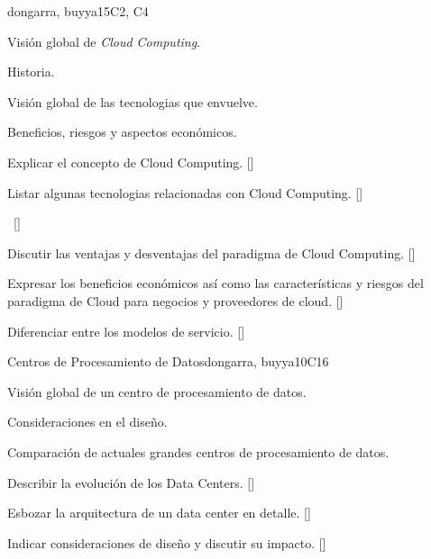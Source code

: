 \begin{syllabus}
\begin{unit}{\PDCloudComputing}{}{dongarra, buyya}{15}{C2, C4}
\begin{topics}
    \item Visión global de {\it Cloud Computing}.
    \item Historia.
    \item Visión global de las tecnologias que envuelve.
    \item Beneficios, riesgos y aspectos económicos.
    \item \PDCloudComputingTopicCloud
    \item \PDCloudComputingTopicInternet
\end{topics}
\begin{learningoutcomes}
    \item Explicar el concepto de Cloud Computing. [\Familiarity]
    \item Listar algunas tecnologias relacionadas con Cloud Computing. [\Familiarity]
    \item \PDCloudComputingLOExplainStrategies~[\Familiarity] %
    \item Discutir las ventajas y desventajas del paradigma de Cloud Computing.  [\Familiarity]
    \item Expresar los beneficios económicos así como las características y riesgos del paradigma de Cloud para negocios y proveedores de cloud.   [\Familiarity]
    \item Diferenciar entre los modelos de servicio.   [\Usage]
\end{learningoutcomes}
\end{unit}

\begin{unit}{Centros de Procesamiento de Datos}{}{dongarra, buyya}{10}{C16}
\begin{topics}
    \item Visión global de un centro de procesamiento de datos.
    \item Consideraciones en el diseño.
    \item Comparación de actuales grandes centros de procesamiento de datos.
\end{topics}
\begin{learningoutcomes}
    \item Describir la evolución de los Data Centers. [\Familiarity]
    \item Esbozar la arquitectura de un data center en detalle. [\Familiarity]
    \item Indicar consideraciones de diseño y discutir su impacto.  [\Familiarity]
\end{learningoutcomes}
\end{unit}


\end{syllabus}
